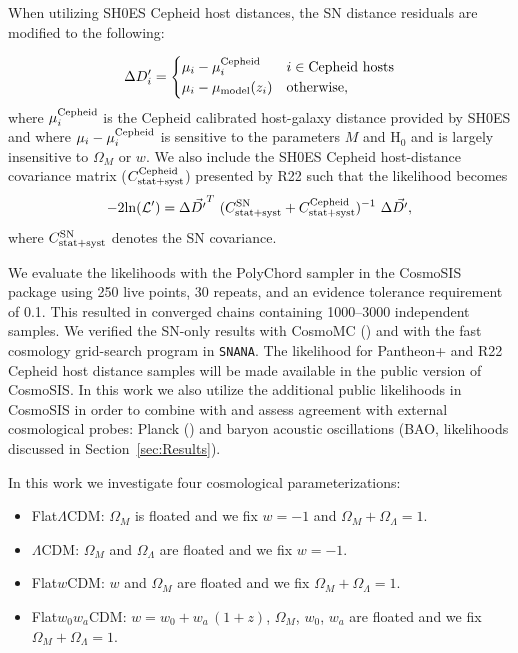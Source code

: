 \documentclass[twocolumn]{aastex63}
\begin{document}
When utilizing SH0ES Cepheid host distances, the SN distance residuals are modified to the following:

\begin{equation}
\label{eq:dmuprime}
\Delta D^\prime_i=
        \begin{cases}
            \mu_i - \mu_i^{{\rm Cepheid}} & i \in \text{Cepheid hosts} \\
            \mu_i - \mu_{{\rm model}}(z_i) &\text{otherwise} ,
        \end{cases}
    \end{equation}
where $\mu_i^{{\rm Cepheid}}$ is the Cepheid calibrated host-galaxy distance provided by SH0ES and where $\mu_i - \mu_i^{{\rm Cepheid}}$ is sensitive to the parameters $M$ and H$_0$ and is largely insensitive to $\Omega_M$ or $w$.  We also include the SH0ES Cepheid host-distance covariance matrix ($C^{\rm Cepheid}_{\rm stat+syst}$) presented by R22 such that the likelihood becomes
\begin{equation}
\label{eq:sh0eslikelihood}
-2{\rm ln}(\mathcal{L}^\prime) = \Delta \vec{D^\prime}^T~(C^{\rm SN}_{\rm stat+syst}+C_{\rm stat+syst}^{\rm Cepheid})^{-1}~\Delta \vec{D^\prime} ,
\end{equation}
where $C^{\rm SN}_{\rm stat+syst}$ denotes the SN covariance. 

We evaluate the likelihoods with the PolyChord \citep{polychord} sampler in the CosmoSIS package \citep{cosmosis} using 250 live points, 30 repeats, and an evidence tolerance requirement of 0.1. This resulted in converged chains containing 1000--3000 independent samples.
 We verified the SN-only results with CosmoMC (\citealt{cosmomc}) and with the fast cosmology grid-search program in \texttt{SNANA}. The likelihood for Pantheon+ and R22 Cepheid host distance samples will be made available in the public version of CosmoSIS. In this work we also utilize the additional public likelihoods in CosmoSIS in order to combine with and assess agreement with external cosmological probes: Planck (\citealt{planck}) and baryon acoustic oscillations (BAO, likelihoods discussed in Section~\ref{sec:Results}).


In this work we investigate four cosmological parameterizations:
\begin{itemize}
\item Flat$\Lambda$CDM: $\Omega_M$ is floated and we fix $w=-1$ and $\Omega_M+\Omega_\Lambda= 1$.
\item $\Lambda$CDM: $\Omega_M$ and $\Omega_\Lambda$ are floated and we fix $w=-1$.
\item Flat$w$CDM: $w$ and $\Omega_M$ are floated and we fix $\Omega_M+\Omega_\Lambda =1$.
\item Flat$w_0w_a$CDM: $w=w_0+w_a\,(1+z)$, $\Omega_M$, $w_0$, $w_a$ are floated and we fix $\Omega_M + \Omega_\Lambda =1$.
\end{itemize}
\end{document}
